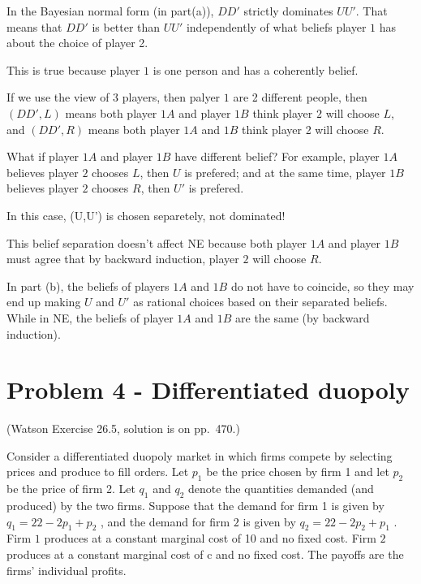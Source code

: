\documentclass{article}
\begin{document}
\begin{mdframed}[backgroundcolor=blue!20,linecolor=white]
In the Bayesian normal form (in part(a)), $DD'$ strictly dominates $UU'$. That means that $DD'$ is better than $UU'$ independently of what beliefs player $1$ has about the choice of player 2. 

This is true because player $1$ is one person and has a coherently belief. 

\medskip

If we use the view of 3 players, then palyer $1$ are 2 different people, then $(DD',L)$ means both player $1A$ and player $1B$ think player $2$ will choose $L$, and $(DD',R)$ means both player $1A$ and $1B$ think player 2 will choose $R$.

\medskip

What if player $1A$ and player $1B$ have different belief? For example, player $1A$ believes player $2$ chooses $L$, then $U$ is prefered; and at the same time, player $1B$ believes player $2$ chooses $R$, then $U'$ is prefered.
\medskip

In this case, (U,U') is chosen separetely, not dominated!

\medskip

This belief separation  doesn't affect NE because both player $1A$ and player $1B$ must agree that by backward induction, player $2$ will choose $R$. 
\end{mdframed}

In part (b), the beliefs of players $1A$ and $1B$ do not have to
coincide, so they may end up making $U$ and $U'$ as rational choices based on their separated beliefs. While in NE, the beliefs of player $1A$ and $1B$ are the same (by backward induction).


\newpage
\section{Problem 4 - Differentiated duopoly}

(Watson Exercise 26.5,  solution is on pp.~470.)

Consider a differentiated duopoly market in which firms compete by selecting
prices and produce to fill orders. Let $p_1$ be the price chosen by firm
1 and let $p_2$ be the price of firm 2. Let $q_1$ and $q_2$ denote the quantities demanded
(and produced) by the two firms. Suppose that the demand for firm
1 is given by $q_1 = 22 - 2p_1 + p_2$ , and the demand for firm $2$ is given by
$q_2 = 22 - 2p_2 + p_1$ . Firm $1$ produces at a constant marginal cost of 10 and
no fixed cost. Firm $2$ produces at a constant marginal cost of c and no fixed
cost. The payoffs are the firms' individual profits.
\end{document}
